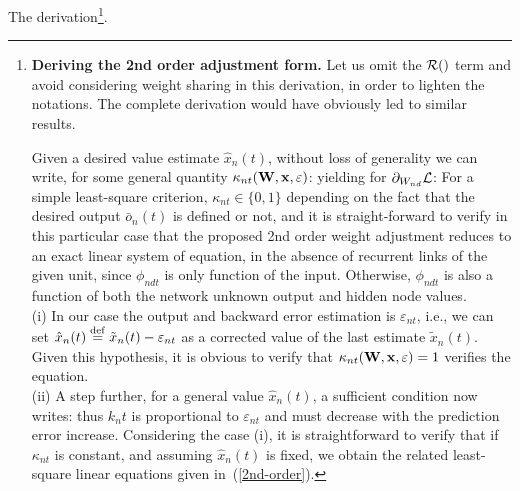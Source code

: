 The derivation\footnote{\label{improvingkappa}{\bf Deriving the 2nd order adjustment form.} Let us omit the ${\cal R}()$ term and avoid considering weight sharing in this derivation, in order to lighten the notations.  The complete derivation would have obviously led to similar results.

Given a desired value estimate $\hat{x}_n(t)$, without loss of generality we can write, for some general quantity $\kappa_{nt}({\bf W} , {\bf x}, {\bf \varepsilon})$:
yielding for $\partial_{W_{nd}} {\cal L}$:
For a simple least-square criterion,  $\kappa_{nt} \in \{0, 1\}$ depending on the fact that the desired output $\bar{o}_n(t)$ is defined or not, and it is straight-forward to verify in this particular case that the proposed 2nd order weight adjustment reduces to an exact linear system of equation, in the absence of recurrent links of the given unit, since $\phi_{ndt}$ is only function of the input. Otherwise, $\phi_{ndt}$ is also a function of both the network unknown output and hidden node values.
\\ (i) In our case the output and backward error estimation is $\varepsilon_{nt}$, i.e., we can set $\hat{x}_n(t) \stackrel {\rm def}{=} \tilde{x}_n(t) - \varepsilon_{nt}$ as a corrected value of the last estimate $\tilde{x}_n(t)$. Given this hypothesis, it is obvious to verify that $\kappa_{nt}({\bf W} , {\bf x}, {\bf \varepsilon}) = 1$ verifies the equation.
\\ (ii) A step further, for a general value $\hat{x}_n(t)$, a sufficient condition now writes:
thus $k_nt$ is proportional to $\varepsilon_{nt}$ and must decrease with the prediction error increase.
Considering the case (i), it is straightforward to verify that if $\kappa_{nt}$ is constant, and assuming $\hat{x}_n(t)$ is fixed, we obtain the related least-square linear equations given in~(\ref{2nd-order}).
\hr}.

